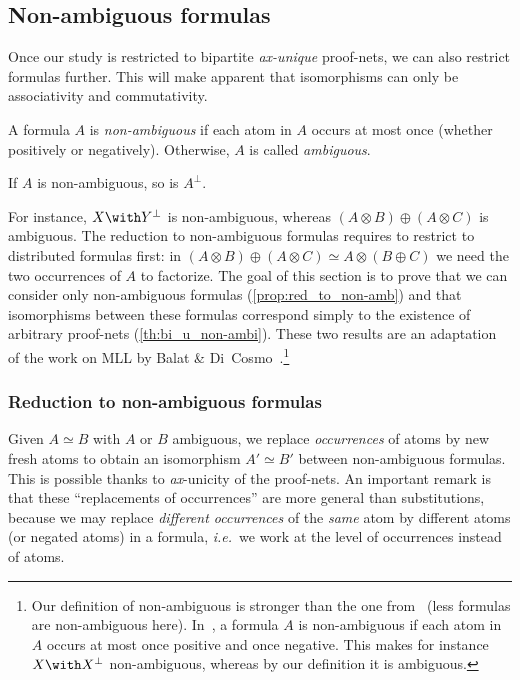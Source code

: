 \documentclass{lmcs}
\newcommand*{\orth}{^\perp} %
\newcommand*{\tens}{\otimes} %
\newcommand*{\ie}{\emph{i.e.}}
\newcommand*{\iso}{\mathrel{\simeq}} %
\newcommand*{\unique}{\textit{ax}-unique}
\begin{document}

\subsection{Non-ambiguous formulas}
\label{sec:red_nonambi}

Once our study is restricted to bipartite \emph{\unique} proof-nets, we can also restrict formulas further.
This will make apparent that isomorphisms can only be associativity and commutativity.

\begin{defi}
\label{def:non-ambiguous}
A formula $A$ is \emph{non-ambiguous} if each atom in $A$ occurs at most once (whether positively or negatively).
Otherwise, $A$ is called \emph{ambiguous}.
\end{defi}

\begin{fact}
\label{rem:non-ambiguous}
If $A$ is non-ambiguous, so is $A\orth$.
\end{fact}

For instance, $X\with Y\orth$ is non-ambiguous, whereas $(A\tens B)\oplus(A\tens C)$ is ambiguous.
The reduction to non-ambiguous formulas requires to restrict to distributed formulas first: in $(A\tens B)\oplus(A\tens C)\iso A\tens(B\oplus C)$ we need the two occurrences of $A$ to factorize.
The goal of this section is to prove that we can consider only non-ambiguous formulas (\autoref{prop:red_to_non-amb}) and that isomorphisms between these formulas correspond simply to the existence of arbitrary proof-nets (\autoref{th:bi_u_non-ambi}).
These two results are an adaptation of the work on MLL by Balat \& Di~Cosmo~\cite[Section~3]{mllisos}.\footnote{
Our definition of non-ambiguous is stronger than the one from~\cite{mllisos} (less formulas are non-ambiguous here).
In~\cite{mllisos}, a formula $A$ is non-ambiguous if each atom in $A$ occurs at most once positive and once negative.
This makes for instance $X \with X\orth$ non-ambiguous, whereas by our definition it is ambiguous.
}


\subsubsection{Reduction to non-ambiguous formulas}
\label{subsec:red_to_non-amb}

Given $A \iso B$ with $A$ or $B$ ambiguous, we replace \emph{occurrences} of atoms by new fresh atoms to obtain an isomorphism $A' \iso B'$ between non-ambiguous formulas.
This is possible thanks to \textit{ax}-unicity of the proof-nets.
An important remark is that these ``replacements of occurrences'' are more general than substitutions, because we may replace \emph{different occurrences} of the \emph{same} atom by different atoms (or negated atoms) in a formula, \ie\ we work at the level of occurrences instead of atoms.
\end{document}
